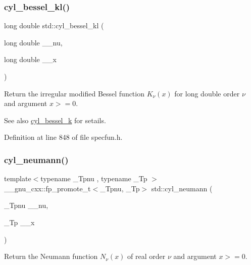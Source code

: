 \subsubsection{\texorpdfstring{cyl\+\_\+bessel\+\_\+kl()}{cyl\_bessel\_kl()}}
{\footnotesize\ttfamily long double std\+::cyl\+\_\+bessel\+\_\+kl (\begin{DoxyParamCaption}\item[{long double}]{\+\_\+\+\_\+nu,  }\item[{long double}]{\+\_\+\+\_\+x }\end{DoxyParamCaption})\hspace{0.3cm}{\ttfamily [inline]}}

Return the irregular modified Bessel function $ K_{\nu}(x) $ for {\ttfamily long double} order $ \nu $ and argument $ x >= 0 $.

\begin{DoxySeeAlso}{See also}
\hyperlink{group__cxx17__math__spec__func_gac73d664b8e7ceba7f8e786c93e97a084}{cyl\+\_\+bessel\+\_\+k} for setails. 
\end{DoxySeeAlso}


Definition at line 848 of file specfun.\+h.

\mbox{\label{group__cxx17__math__spec__func_ga1e4bef23704469b0704cf15c5f04e29e}} 
\subsubsection{\texorpdfstring{cyl\+\_\+neumann()}{cyl\_neumann()}}
{\footnotesize\ttfamily template$<$typename \+\_\+\+Tpnu , typename \+\_\+\+Tp $>$ \\
\+\_\+\+\_\+gnu\+\_\+cxx\+::fp\+\_\+promote\+\_\+t$<$\+\_\+\+Tpnu, \+\_\+\+Tp$>$ std\+::cyl\+\_\+neumann (\begin{DoxyParamCaption}\item[{\+\_\+\+Tpnu}]{\+\_\+\+\_\+nu,  }\item[{\+\_\+\+Tp}]{\+\_\+\+\_\+x }\end{DoxyParamCaption})\hspace{0.3cm}{\ttfamily [inline]}}

Return the Neumann function $ N_{\nu}(x) $ of real order $ \nu $ and argument $ x >= 0 $.

